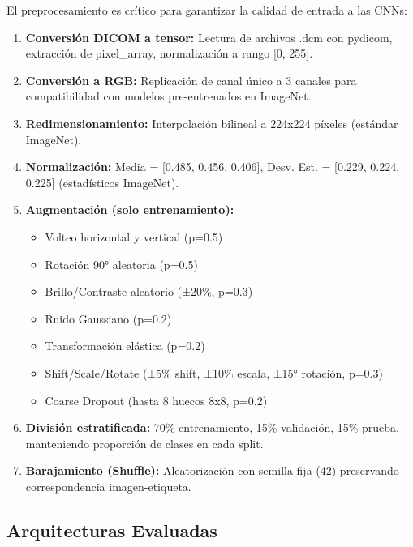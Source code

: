 \documentclass[12pt,a4paper]{article}
\begin{document}
El preprocesamiento es crítico para garantizar la calidad de entrada a las CNNs:

\begin{enumerate}
    \item \textbf{Conversión DICOM a tensor:} Lectura de archivos .dcm con pydicom, 
          extracción de pixel\_array, normalización a rango [0, 255].
    \item \textbf{Conversión a RGB:} Replicación de canal único a 3 canales para compatibilidad 
          con modelos pre-entrenados en ImageNet.
    \item \textbf{Redimensionamiento:} Interpolación bilineal a 224x224 píxeles (estándar ImageNet).
    \item \textbf{Normalización:} Media = [0.485, 0.456, 0.406], Desv. Est. = [0.229, 0.224, 0.225] 
          (estadísticos ImageNet).
    \item \textbf{Augmentación (solo entrenamiento):}
          \begin{itemize}
              \item Volteo horizontal y vertical (p=0.5)
              \item Rotación 90° aleatoria (p=0.5)
              \item Brillo/Contraste aleatorio (±20\%, p=0.3)
              \item Ruido Gaussiano (p=0.2)
              \item Transformación elástica (p=0.2)
              \item Shift/Scale/Rotate (±5\% shift, ±10\% escala, ±15° rotación, p=0.3)
              \item Coarse Dropout (hasta 8 huecos 8x8, p=0.2)
          \end{itemize}
    \item \textbf{División estratificada:} 70\% entrenamiento, 15\% validación, 15\% prueba, 
          manteniendo proporción de clases en cada split.
    \item \textbf{Barajamiento (Shuffle):} Aleatorización con semilla fija (42) preservando 
          correspondencia imagen-etiqueta.
\end{enumerate}

\subsection{Arquitecturas Evaluadas}
\label{subsec:arquitecturas}
\end{document}
